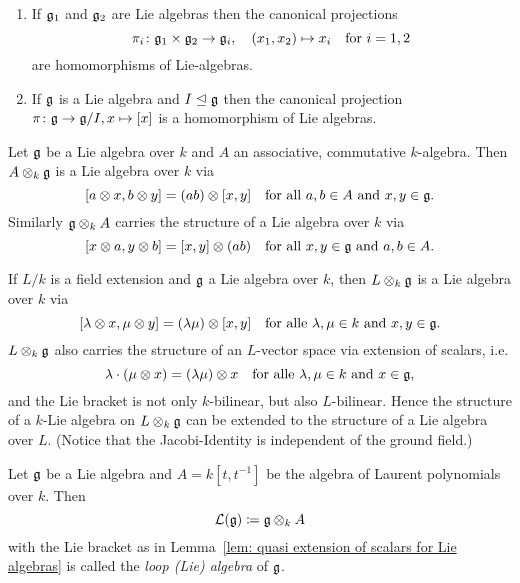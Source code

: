\begin{lem}
 \begin{enumerate}[leftmargin=*]
  \item
   If $\mathfrak{g}_1$ and $\mathfrak{g}_2$ are Lie algebras then the canonical projections
   \[
    \pi_i \colon \mathfrak{g}_1 \times \mathfrak{g}_2 \to \mathfrak{g}_i, \quad (x_1, x_2) \mapsto x_i
    \quad \text{for $i = 1, 2$}
   \]
   are homomorphisms of Lie-algebras.
  \item
   If $\mathfrak{g}$ is a Lie algebra and $I \trianglelefteq \mathfrak{g}$ then the canonical projection $\pi \colon \mathfrak{g} \to \mathfrak{g}/I, x \mapsto [x]$ is a homomorphism of Lie algebras.
 \end{enumerate}
\end{lem}



\begin{lem}\label{lem: quasi extension of scalars for Lie algebras}
Let $\mathfrak{g}$ be a Lie algebra over $k$ and $A$ an associative, commutative $k$-algebra. Then $A \otimes_k \mathfrak{g}$ is a Lie algebra over $k$ via
\[
 [a \otimes x, b \otimes y] = (ab) \otimes [x,y]
 \quad
 \text{for all $a,b \in A$ and $x,y \in \mathfrak{g}$}.
\]
Similarly $\mathfrak{g} \otimes_k A$ carries the structure of a Lie algebra over $k$ via
\[
 [x \otimes a, y \otimes b] = [x,y] \otimes (ab)
 \quad
 \text{for all $x,y \in \mathfrak{g}$ and $a,b \in A$}.
\]
\end{lem}


\begin{expl}
 If $L/k$ is a field extension and $\mathfrak{g}$ a Lie algebra over $k$, then $L \otimes_k \mathfrak{g}$ is a Lie algebra over $k$ via
 \[
  [\lambda \otimes x, \mu \otimes y] = (\lambda \mu) \otimes [x,y]
  \quad
  \text{for alle $\lambda, \mu \in k$ and $x,y \in \mathfrak{g}$}.
 \]
 $L \otimes_k \mathfrak{g}$ also carries the structure of an $L$-vector space via extension of scalars, i.e.
 \[
  \lambda \cdot (\mu \otimes x) = (\lambda \mu) \otimes x
  \quad
  \text{for alle $\lambda, \mu \in k$ and $x \in \mathfrak{g}$},
 \]
 and the Lie bracket is not only $k$-bilinear, but also $L$-bilinear. Hence the structure of a $k$-Lie algebra on $L \otimes_k \mathfrak{g}$ can be extended to the structure of a Lie algebra over $L$. (Notice that the Jacobi-Identity is independent of the ground field.)
\end{expl}


\begin{defi}
 Let $\mathfrak{g}$ be a Lie algebra and $A = k[t,t^{-1}]$ be the algebra of Laurent polynomials over $k$. Then
 \[
  \mathcal{L}(\mathfrak{g}) \coloneqq \mathfrak{g} \otimes_k A
 \]
 with the Lie bracket as in Lemma~\ref{lem: quasi extension of scalars for Lie algebras} is called the \emph{loop (Lie) algebra} of $\mathfrak{g}$.
\end{defi}


